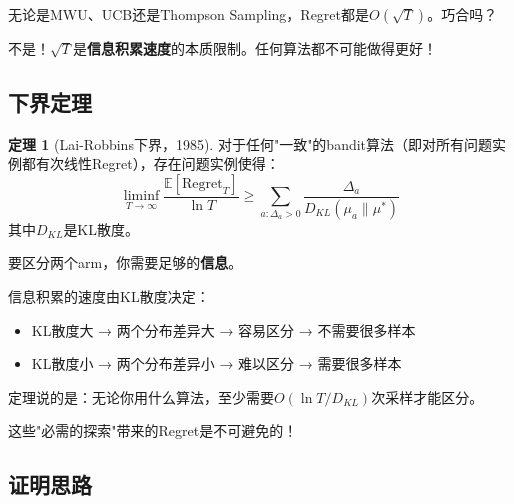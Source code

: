 \documentclass[11pt,a4paper]{article}
\theoremstyle{definition}
\newtheorem{theorem}{定理}[section]
\begin{document}
\begin{plainwords}
无论是MWU、UCB还是Thompson Sampling，Regret都是$O(\sqrt{T})$。巧合吗？

不是！$\sqrt{T}$是\textbf{信息积累速度}的本质限制。任何算法都不可能做得更好！
\end{plainwords}

\subsection{下界定理}

\begin{theorem}[Lai-Robbins下界，1985]
对于任何"一致"的bandit算法（即对所有问题实例都有次线性Regret），存在问题实例使得：
\[
\liminf_{T \to \infty} \frac{\mathbb{E}[\text{Regret}_T]}{\ln T} \geq \sum_{a: \Delta_a > 0} \frac{\Delta_a}{D_{KL}(\mu_a \| \mu^*)}
\]
其中$D_{KL}$是KL散度。
\end{theorem}

\begin{plainwords}[这个下界在说什么]
要区分两个arm，你需要足够的\textbf{信息}。

信息积累的速度由KL散度决定：
\begin{itemize}
    \item KL散度大 → 两个分布差异大 → 容易区分 → 不需要很多样本
    \item KL散度小 → 两个分布差异小 → 难以区分 → 需要很多样本
\end{itemize}

定理说的是：无论你用什么算法，至少需要$O(\ln T / D_{KL})$次采样才能区分。

这些"必需的探索"带来的Regret是不可避免的！
\end{plainwords}

\subsection{证明思路}
\end{document}
